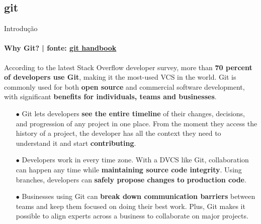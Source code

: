 \documentclass[xcolor=dvipsnames,t]{beamer}
\begin{document}
\subsection{git}

\begin{frame}{Introdução}
\framesubtitle{Why Git? | fonte: \href{https://guides.github.com/introduction/git-handbook/}{\color{blue} git handbook}}
\small
According to the latest Stack Overflow developer survey, more than \textbf{70 percent of developers use Git}, making it the most-used VCS in the world. Git is commonly used for both \textbf{open source} and commercial software development, with significant \textbf{benefits for individuals, teams and businesses}.

\begin{itemize}
	\item[$ \bullet $] Git lets developers \textbf{see the entire timeline} of their changes, decisions, and progression of any project in one place. From the moment they access the history of a project, the developer has all the context they need to understand it and start \textbf{contributing}.
	\item[$ \bullet $] Developers work in every time zone. With a DVCS like Git, collaboration can happen any time while \textbf{maintaining source code integrity}. Using branches, developers can \textbf{safely propose changes to production code}.
	\item[$ \bullet $] Businesses using Git can \textbf{break down communication barriers} between teams and keep them focused on doing their best work. Plus, Git makes it possible to align experts across a business to collaborate on major projects.
\end{itemize}

\end{frame}
\end{document}
